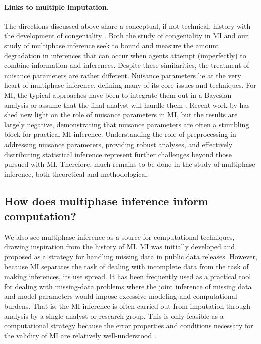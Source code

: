 \paragraph{Links to multiple imputation.}
The directions discussed above share a conceptual, if not technical, history with the development of congeniality \citep{Meng1994}.
Both the study of congeniality in MI and our study of multiphase inference seek to bound and measure the amount degradation in inferences that can occur when agents attempt (imperfectly) to combine information and inferences.
Despite these similarities, the treatment of nuisance parameters are rather different.
Nuisance parameters lie at the very heart of multiphase inference, defining many of its core issues and techniques.
For MI, the typical approaches have been to integrate them out in a Bayesian analysis \citep[e.g.,][]{Rubin1996} or assume that the final analyst will handle them \citep[e.g.,][]{Nielsen2003}.
Recent work by \cite{Xie2012} has shed new light on the role of nuisance parameters in MI, but the results are largely negative, demonstrating that nuisance parameters are often a stumbling block for practical MI inference.
Understanding the role of preprocessing in addressing nuisance parameters, providing robust analyses, and effectively distributing statistical inference represent further challenges beyond those pursued with MI.
Therefore, much remains to be done in  the study of multiphase inference, both theoretical and methodological.

\subsection{How does multiphase inference inform computation?}
\label{multiphase:sec:computation}

We also see multiphase inference as a source for computational techniques, drawing inspiration from the history of MI.
MI was initially developed and proposed as a strategy for handling missing data in public data releases.
However, because MI separates the task of dealing with incomplete data from the task of making inferences, its use spread.
It has been frequently used as a practical tool for dealing with missing-data problems where the joint inference of missing data and model parameters would impose excessive modeling and computational burdens.
That is, the MI inference is often carried out from imputation through analysis by a single analyst or research group.
This is only feasible as a computational strategy because the error properties and conditions necessary for the validity of MI are relatively well-understood \citep[e.g.,][]{Meng1994,Xie2012}.

